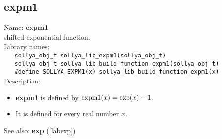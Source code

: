 \subsection{expm1}
\label{labexpm1}
\noindent Name: \textbf{expm1}\\
\phantom{aaa}shifted exponential function.\\[0.2cm]
\noindent Library names:\\
\verb|   sollya_obj_t sollya_lib_expm1(sollya_obj_t)|\\
\verb|   sollya_obj_t sollya_lib_build_function_expm1(sollya_obj_t)|\\
\verb|   #define SOLLYA_EXPM1(x) sollya_lib_build_function_expm1(x)|\\[0.2cm]
\noindent Description: \begin{itemize}

\item \textbf{expm1} is defined by ${\rm expm1}(x) = \exp(x)-1$.

\item It is defined for every real number $x$.
\end{itemize}
See also: \textbf{exp} (\ref{labexp})
